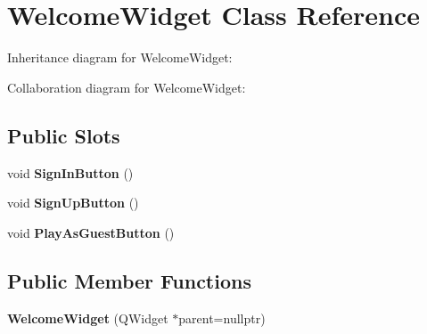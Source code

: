 \hypertarget{classWelcomeWidget}{}\section{Welcome\+Widget Class Reference}
\label{classWelcomeWidget}


Inheritance diagram for Welcome\+Widget\+:


Collaboration diagram for Welcome\+Widget\+:
\subsection*{Public Slots}
\begin{DoxyCompactItemize}
\item 
\mbox{\label{classWelcomeWidget_abd744cc72e89fc94825bcbce670181d0}} 
void {\bfseries Sign\+In\+Button} ()
\item 
\mbox{\label{classWelcomeWidget_a3c90bf38f03e2892d4a990ba3cdcf958}} 
void {\bfseries Sign\+Up\+Button} ()
\item 
\mbox{\label{classWelcomeWidget_adf8132423915c0d69ac51c9cb4cec04b}} 
void {\bfseries Play\+As\+Guest\+Button} ()
\end{DoxyCompactItemize}
\subsection*{Public Member Functions}
\begin{DoxyCompactItemize}
\item 
\mbox{\label{classWelcomeWidget_a8098178a4ddbc597a6afe1a151fd40a6}} 
{\bfseries Welcome\+Widget} (Q\+Widget $\ast$parent=nullptr)
\end{DoxyCompactItemize}
